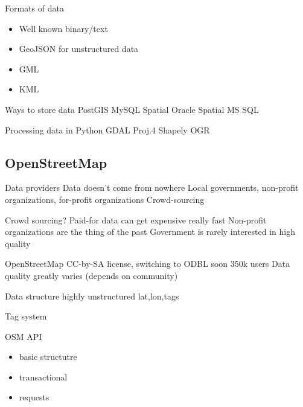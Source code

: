 \documentclass{beamer}
\begin{document}
\begin{frame}{Formats of data}
  \begin{itemize}
  \item Well known binary/text
  \item GeoJSON for unstructured data
  \item GML
  \item KML
  \end{itemize}
\end{frame}

\begin{frame}{Ways to store data}
  PostGIS
  MySQL Spatial
  Oracle Spatial
  MS SQL
\end{frame}

\begin{frame}{Processing data in Python}
  GDAL
  Proj.4
  Shapely
  OGR
\end{frame}

\subsection{OpenStreetMap}

\begin{frame}{Data providers}
  Data doesn't come from nowhere
  Local governments, non-profit organizations, for-profit organizations
Crowd-sourcing
\end{frame}

\begin{frame}{Crowd sourcing?}
  Paid-for data can get expensive really fast
  Non-profit organizations are the thing of the past
  Government is rarely interested in high quality
\end{frame}

\begin{frame}{OpenStreetMap}
  CC-by-SA license, switching to ODBL soon
  350k users
  Data quality greatly varies (depends on community)
\end{frame}

\begin{frame}{Data structure}
highly unstructured
lat,lon,tags
\end{frame}

\begin{frame}{Tag system}

\end{frame}

\begin{frame}{OSM API}
  \begin{itemize}
  \item basic structutre
  \item transactional
  \item requests
  \end{itemize}
\end{frame}
\end{document}
